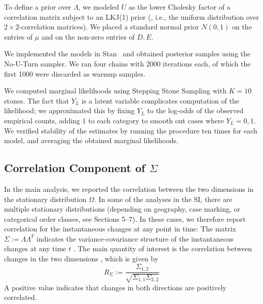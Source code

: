 \documentclass[11pt,a4paper]{article}
\begin{document}
To define a prior over $\Lambda$, we modeled $U$ as the lower Cholesky factor of a correlation matrix subject to an LKJ(1) prior (\citet{lewandowski2009generating}, i.e., the uniform distribution over $2\times 2$-correlation matrices).
We placed a standard normal prior $N(0,1)$ on the entries of $\mu$ and on the non-zero entries of $D, E$.

We implemented the models in Stan~\citep{carpenter2017stan} and obtained posterior samples using the No-U-Turn sampler.
We ran four chains with 2000 iterations each, of which the first 1000 were discarded as warmup samples.

We computed marginal likelihoods using Stepping Stone Sampling \citep{xie2011improving} with $K=10$ stones.
The fact that $Y_L$ is a latent variable complicates computation of the likelihood; we approximated this by fixing $Y_L$ to the log-odds of the observed empirical counts, adding $1$ to each category to smooth out cases where $Y_L =0,1$.
We verified stability of the estimates by running the procedure ten times for each model, and averaging the obtained marginal likelihoods.


\subsection{Correlation Component of $\Sigma$}\label{sec:instant-corr}
In the main analysis, we reported the correlation between the two dimensions in the stationary distribution $\Omega$.
In some of the analyses in the SI, there are multiple stationary distributions (depending on geography, case marking, or categorical order classes, see Sections 5--7).
In these cases, we therefore report correlation for the instantaneous changes at any point in time:
The matrix $\Sigma := \Lambda\Lambda^T$ indicates the variance-covariance structure of the instantaneous changes at any time $t$ \citep{felsenstein1973maximum, freckleton2012fast}.
The main quantity of interest is the correlation between changes in the two dimensions \citep[cf.][]{felsenstein1973maximum,freckleton2012fast}, which is given by
\begin{equation}
R_\Sigma := \frac{\Sigma_{1,2}}{\sqrt{\Sigma_{1,1}\Sigma_{2,2}}}
\end{equation}
A positive value indicates that changes in both directions are positively correlated.
%
%
\end{document}

